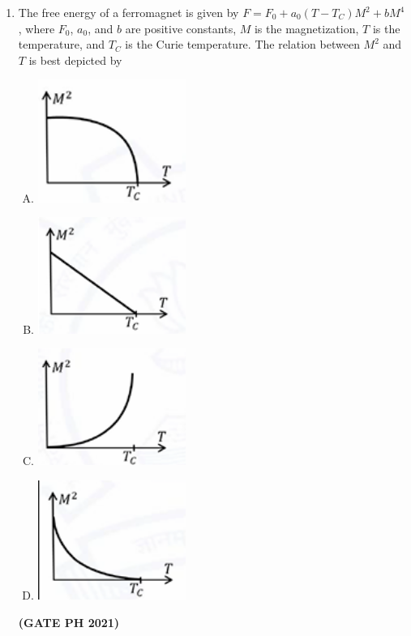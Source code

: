\documentclass[14pt, a4paper]{extarticle}
\begin{document}
\begin{enumerate}[label=\textbf{Q.\arabic*}]
\begin{enumerate}[label=\textbf{Q.\arabic*}]
\item The free energy of a ferromagnet is given by $F = F_0 + a_0(T-T_C)M^2 + bM^4$, where $F_0$, $a_0$, and $b$ are positive constants, $M$ is the magnetization, $T$ is the temperature, and $T_C$ is the Curie temperature. The relation between $M^2$ and $T$ is best depicted by
\begin{enumerate}[(A)]
\item \includegraphics[width=0.4\textwidth]{figs/q48figa21.png}
\item \includegraphics[width=0.4\textwidth]{figs/q48figb21.png}
\item \includegraphics[width=0.4\textwidth]{figs/q48figc21.png}
\item \includegraphics[width=0.4\textwidth]{figs/q48figd21.png}
\end{enumerate}
\hfill \textbf{(GATE PH 2021)}


\end{enumerate}
\end{enumerate}
\end{document}
